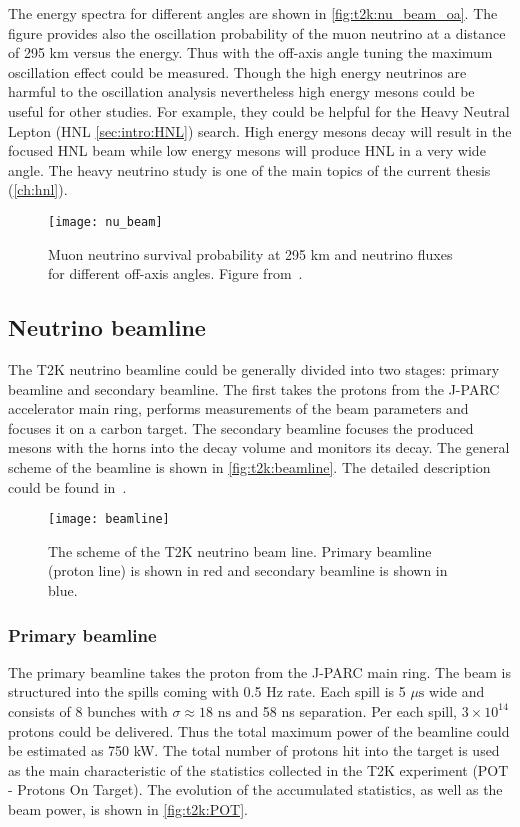 \documentclass[../main.tex]{subfiles}
\begin{document}
 The energy spectra for different angles are shown in \autoref{fig:t2k:nu_beam_oa}. The figure provides also the oscillation probability of the muon neutrino at a distance of 295 km versus the energy. Thus with the off-axis angle tuning the maximum oscillation effect could be measured. Though the high energy neutrinos are harmful to the oscillation analysis nevertheless high energy mesons could be useful for other studies. For example, they could be helpful for the Heavy Neutral Lepton (HNL \autoref{sec:intro:HNL}) search. High energy mesons decay will result in the focused HNL beam while low energy mesons will produce HNL in a very wide angle. The heavy neutrino study is one of the main topics of the current thesis (\autoref{ch:hnl}).

\begin{figure}[!ht]
  \centering
  \texttt{[image: nu\_beam]}
  \caption{Muon neutrino survival probability at 295 km and neutrino fluxes for different off-axis angles. Figure from~\cite{Abe2013}.}
  \label{fig:t2k:nu_beam_oa}
\end{figure}

\subsection{Neutrino beamline}
The T2K neutrino beamline could be generally divided into two stages: primary beamline and secondary beamline. The first takes the protons from the J-PARC accelerator main ring, performs measurements of the beam parameters and focuses it on a carbon target. The secondary beamline focuses the produced mesons with the horns into the decay volume and monitors its decay. The general scheme of the beamline is shown in \autoref{fig:t2k:beamline}. The detailed description could be found in~\cite{Abe2013}.

\begin{figure}[!ht]
  \centering
  \texttt{[image: beamline]}
  \caption{The scheme of the T2K neutrino beam line. Primary beamline (proton line) is shown in red and secondary beamline is shown in blue.}
  \label{fig:t2k:beamline}
\end{figure}

\subsubsection{Primary beamline}
The primary beamline takes the proton from the J-PARC main ring. The beam is structured into the spills coming with 0.5 Hz rate. Each spill is 5 $\mu\text{s}$ wide and consists of 8 bunches with $\sigma\approx18 \text{ ns}$ and 58 ns separation. Per each spill, $3\times10^{14}$ protons could be delivered. Thus the total maximum power of the beamline could be estimated as 750 kW. The total number of protons hit into the target is used as the main characteristic of the statistics collected in the T2K experiment (POT - Protons On Target). The evolution of the accumulated statistics, as well as the beam power, is shown in \autoref{fig:t2k:POT}.
\end{document}

